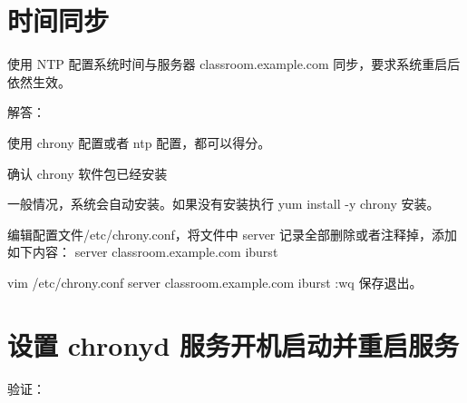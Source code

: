 \documentclass[letterpaper,10pt,english]{sphinxmanual}
\begin{document}
\section{时间同步}
\label{\detokenize{rhcsa/rhcsa_7:id8}}
使用 NTP 配置系统时间与服务器 classroom.example.com 同步，要求系统重启后依然生效。

解答：

使用 chrony 配置或者 ntp 配置，都可以得分。

确认 chrony 软件包已经安装

%
\begin{sphinxVerbatim}[commandchars=\\\{\}]
  
\end{sphinxVerbatim}

一般情况，系统会自动安装。如果没有安装执行 yum install -y chrony 安装。

编辑配置文件/etc/chrony.conf，将文件中 server 记录全部删除或者注释掉，添加如下内容：
server classroom.example.com iburst

%
\begin{sphinxVerbatim}\PYGZsh{} vim /etc/chrony.conf
server classroom.example.com iburst
:wq 保存退出。
\end{sphinxVerbatim}


\section{设置 chronyd 服务开机启动并重启服务}
\label{\detokenize{rhcsa/rhcsa_7:chronyd}}
%
\begin{sphinxVerbatim}[commandchars=\\\{\}]
\PYG{p}{[} \PYG{p}{]}
\PYG{p}{[} \PYG{p}{]}
\end{sphinxVerbatim}

验证：

%
\begin{sphinxVerbatim}[commandchars=\\\{\}]
\PYG{p}{[} \PYG{p}{]}
\end{sphinxVerbatim}
\end{document}
